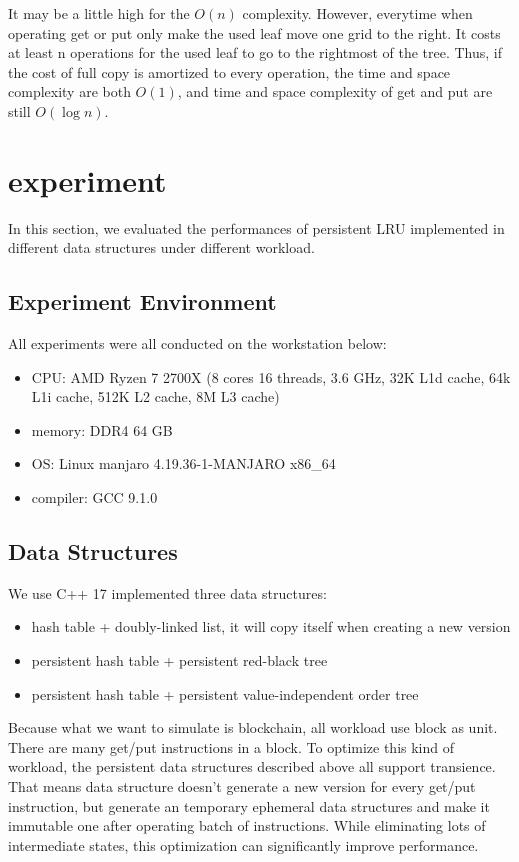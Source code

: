 \documentclass[conference]{IEEEtran}
\begin{document}
It may be a little high for the $O(n)$ complexity.
However, everytime when operating get or put only
make the used leaf move one grid to the right.
It costs  at least n operations for the used leaf
to go to the rightmost of the tree. Thus, if the
cost of full copy is amortized to every operation,
the time and space complexity are both $O(1)$,
and time and space complexity of get and put are still $O(\log n)$.

\section{experiment}
In this section, we evaluated the performances of 
persistent LRU implemented in different data 
structures under different workload.

\subsection{Experiment Environment}
All experiments were all conducted on the workstation below:

\begin{itemize}
\item CPU: AMD Ryzen 7 2700X (8 cores 16 threads, 3.6 GHz, 32K L1d cache, 64k L1i cache, 512K L2 cache, 8M L3 cache)
\item memory: DDR4 64 GB
\item OS: Linux manjaro 4.19.36-1-MANJARO x86\_64
\item compiler: GCC 9.1.0
\end{itemize}

\subsection{Data Structures}

We use C++ 17 implemented three data structures:

\begin{itemize}
\item hash table + doubly-linked list, it will copy itself when creating a new version
\item persistent hash table + persistent red-black tree
\item persistent hash table + persistent value-independent order tree
\end{itemize}

Because what we want to simulate is blockchain,
all workload use block as unit.
There are many get/put instructions in a block.
To optimize this kind of workload,
the persistent data structures described above all
support transience. That means data structure doesn't 
generate a new version for every get/put instruction,
but generate an temporary ephemeral data structures and
make it immutable one after operating batch of instructions.
While eliminating lots of intermediate states,
this optimization can significantly improve performance.
\end{document}
